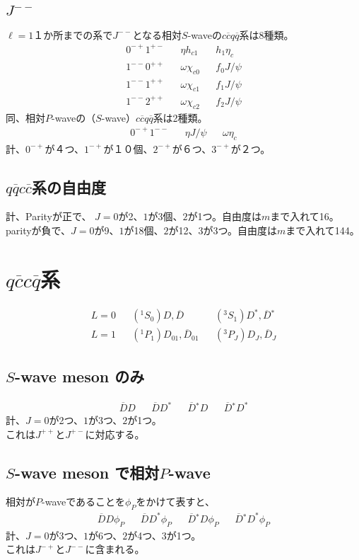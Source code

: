 \documentclass[a4j]{jarticle}
\def\Jpsi{{J\!/\!\psi}{}}
\def\cbar{\overline{{c}}}
\def\qbar{\overline{{q}}}
\def\Dbar{\overline{{D}}{}}
\begin{document}
\subsection{$J^{--}$}
$\ell=1$１か所までの系で$J^{--}$となる相対$S$-waveの$c\cbar q\qbar$系は8種類。
\begin{align}
0^{-+}1^{+-}&&\eta h_{c1} && h_1 \eta_c\\
1^{--}0^{++}&&\omega\chi_{c0}&&f_0\Jpsi \\
1^{--}1^{++}&&\omega\chi_{c1}&&f_1\Jpsi \\
1^{--}2^{++}&&\omega\chi_{c2}&&f_2\Jpsi 
\end{align}
同、相対$P$-waveの（$S$-wave）$c\cbar q\qbar$系は2種類。
\begin{align}
0^{-+}1^{--}&&\eta \Jpsi && \omega \eta_c
\end{align}
計、$0^{-+}$が４つ、$1^{-+}$が１０個、$2^{-+}$が６つ、$3^{-+}$が２つ。\\

\subsection{$q\qbar c\cbar$系の自由度}

計、Parityが正で、
$J=0$が2、$1$が3個、$2$が1つ。自由度は$m$まで入れて16。
parityが負で、$J=0$が9、$1$が18個、$2$が12、$3$が3つ。自由度は$m$まで入れて144。\\

\section{$q\cbar c\qbar$系}
\begin{align}
L=0&&(^1S_0) D,\Dbar &&(^3S_1) D^*,\Dbar^*\\
L=1&&(^1P_1) D_{01},\Dbar_{01} &&(^3P_J) D_{J},\Dbar_{J}
\end{align}

\subsection{$S$-wave meson のみ}
\begin{align}
\Dbar D &&\Dbar D^*&&\Dbar^* D&&\Dbar^* D^*
\end{align}
計、$J=0$が2つ、$1$が3つ、$2$が1つ。\\
これは$J^{++}$と$J^{+-}$に対応する。

\subsection{$S$-wave meson で相対$P$-wave}
相対が$P$-waveであることを$\phi_P$をかけて表すと、
\begin{align}
\Dbar D\phi_P &&\Dbar D^*\phi_P&&\Dbar^* D\phi_P&&\Dbar^* D^*\phi_P
\end{align}
計、$J=0$が3つ、$1$が6つ、$2$が4つ、$3$が1つ。\\
これは$J^{-+}$と$J^{--}$に含まれる。
\end{document}
